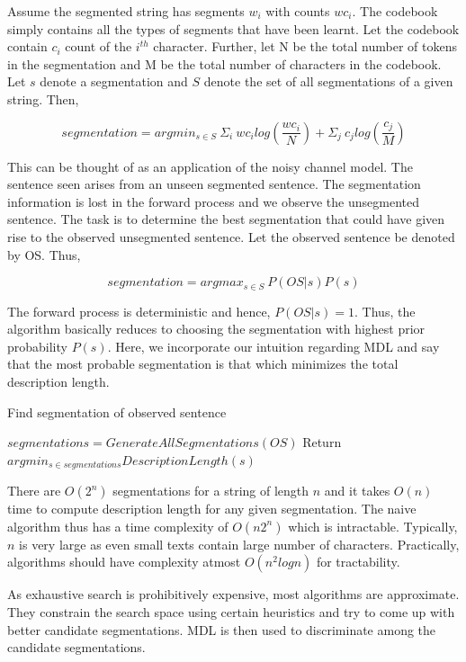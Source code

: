 \documentclass[runningheads]{llncs}
\begin{document}
Assume the segmented string has segments $w_{i}$ with counts $wc_{i}$. The codebook simply contains all the types of segments that have been learnt. Let the codebook contain $c_{i}$ count of the $i^{th}$ character. Further, let N be the total number of tokens in the segmentation and M be the total number of characters in the codebook. Let $s$ denote a segmentation and $S$ denote the set of all segmentations of a given string. Then,

$$segmentation = argmin_{s \in S}\ \Sigma_{i}\ wc_{i}log(\frac{wc_{i}}{N}) + \Sigma_{j}\  c_{j}log(\frac{c_{j}}{M})$$

This can be thought of as an application of the noisy channel model. The sentence seen arises from an unseen segmented sentence. The segmentation information is lost in the forward process and we observe the unsegmented sentence. The task is to determine the best segmentation that could have given rise to the observed unsegmented sentence. Let the observed sentence be denoted by OS. Thus, 

$$ segmentation = argmax_{s \in S}\ P(OS|s)P(s)$$

The forward process is deterministic and hence, $P(OS|s) = 1$. Thus, the algorithm basically reduces to choosing the segmentation with highest prior probability $P(s)$. Here, we incorporate our intuition regarding MDL and say that the most probable segmentation is that which minimizes the total description length.

\begin{algorithm}
		\caption{Find segmentation of observed sentence}
		\begin{algorithmic}[1]
			\State $segmentations = GenerateAllSegmentations(OS)$
			\State Return $argmin_{s \in segmentations} DescriptionLength(s)$
			\EndProcedure
		\end{algorithmic}
\end{algorithm}

There are $O(2^n)$ segmentations for a string of length $n$ and it takes $O(n)$ time to compute description length for any given segmentation. The naive algorithm thus has a time complexity of $O(n2^n)$ which is intractable. Typically, $n$ is very large as even small texts contain large number of characters. Practically, algorithms should have complexity atmost $O(n^2logn)$ for tractability.

As exhaustive search is prohibitively expensive, most algorithms are approximate. They constrain the search space using certain heuristics and try to come up with better candidate segmentations. MDL is then used to discriminate among the candidate segmentations. 
\end{document}
